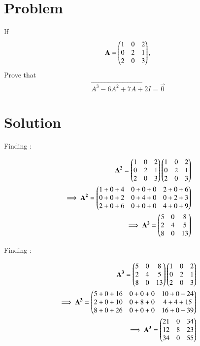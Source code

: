 \documentclass[journal,12pt,twocolumn]{IEEEtran}
\begin{document}
\section{Problem}
If 
\begin{align}
\mathbf{A} = \begin{pmatrix}1 & 0 & 2 \\ 0 & 2 & 1 \\ 2 & 0 & 3\end{pmatrix},
\end{align}
Prove that
\begin{align}
\vec{A^3 - 6A^2 + 7A + 2I} = \vec{0}
\end{align}

\section{Solution}
Finding :

\begin{align}
    \mathbf{A^2} = \begin{pmatrix}1 & 0 & 2 \\ 0 & 2 & 1 \\ 2 & 0 & 3\end{pmatrix}\begin{pmatrix}1 & 0 & 2 \\ 0 & 2 & 1 \\ 2 & 0 & 3\end{pmatrix}
    \\
    \implies \mathbf{A^2} = \begin{pmatrix}1 + 0 + 4 & 0 + 0 + 0 & 2 + 0 + 6
                             \\ 0 + 0 +2 & 0 + 4 + 0 & 0 + 2 + 3
                             \\ 2 + 0 +6 & 0 + 0 +0 & 4+0+9\end{pmatrix}
    \\                         
    \implies \mathbf{A^2} = \begin{pmatrix}5 & 0 & 8
                             \\ 2 & 4 & 5
                             \\ 8 & 0 & 13\end{pmatrix}                           
\end{align}

Finding :

\begin{align}
    \mathbf{A^3} = \begin{pmatrix}5 & 0 & 8 \\ 2 & 4 & 5 \\ 8 & 0 & 13\end{pmatrix}\begin{pmatrix}1 & 0 & 2 \\ 0 & 2 & 1 \\ 2 & 0 & 3\end{pmatrix}
    \\
    \implies \mathbf{A^3} = \begin{pmatrix}5 + 0 + 16 & 0 + 0 + 0 & 10 + 0 + 24
                             \\ 2 + 0 +10 & 0 + 8 + 0 & 4 + 4 + 15
                             \\ 8 + 0 + 26 & 0 + 0 +0 & 16+0+39\end{pmatrix}
    \\                         
    \implies \mathbf{A^3} = \begin{pmatrix}21 & 0 & 34
                             \\ 12 & 8 & 23
                             \\ 34 & 0 & 55\end{pmatrix}                           
\end{align}
\end{document}
